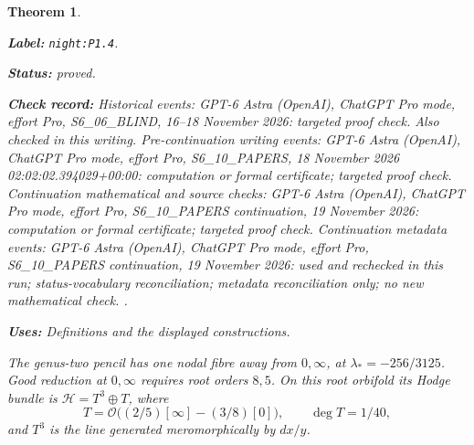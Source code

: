 \documentclass[11pt,a4paper]{article}
\newtheorem{theorem}{Theorem}[section]
\theoremstyle{definition}
\newcommand{\StatementRecord}[4]{\par\smallskip\begingroup\upshape\raggedright\noindent\textbf{Label:} \nolinkurl{#1}.\par\noindent\textbf{Status:} #2.\par\noindent\textbf{Check record:} #3.\par\noindent\textbf{Uses:} #4.\par\endgroup\smallskip}
\begin{document}
\begin{theorem}\label{night:P1.4}
\StatementRecord{night:P1.4}{proved}{Historical events: GPT-6 Astra (OpenAI), ChatGPT Pro mode, effort Pro, S6\_06\_BLIND, 16--18 November 2026: targeted proof check. Also checked in this writing. Pre-continuation writing events: GPT-6 Astra (OpenAI), ChatGPT Pro mode, effort Pro, S6\_10\_PAPERS, 18 November 2026 02:02:02.394029+00:00: computation or formal certificate; targeted proof check. Continuation mathematical and source checks: GPT-6 Astra (OpenAI), ChatGPT Pro mode, effort Pro, S6\_10\_PAPERS continuation, 19 November 2026: computation or formal certificate; targeted proof check. Continuation metadata events: GPT-6 Astra (OpenAI), ChatGPT Pro mode, effort Pro, S6\_10\_PAPERS continuation, 19 November 2026: used and rechecked in this run; status-vocabulary reconciliation; metadata reconciliation only; no new mathematical check. }{Definitions and the displayed constructions}
The genus-two pencil has one nodal fibre away from $0,\infty$, at
$\lambda_*=-256/3125$.  Good reduction at $0,\infty$ requires root
orders $8,5$.  On this root orbifold its Hodge bundle is
$\mathcal H=T^3\oplus T$, where
\[
T=\mathcal O\bigl((2/5)[\infty]-(3/8)[0]\bigr),\qquad
\deg T=1/40,
\]
and $T^3$ is the line generated meromorphically by $dx/y$.
\end{theorem}
\end{document}
